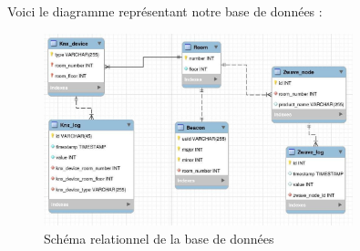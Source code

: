 Voici le diagramme représentant notre base de données :


\begin{figure}
    \begin{center}
        \includegraphics[width=0.8\textwidth]{img/diagramme_db.jpg}
    \end{center}
    \caption{Schéma relationnel de la base de données}
    \label{db_schema}
\end{figure}
